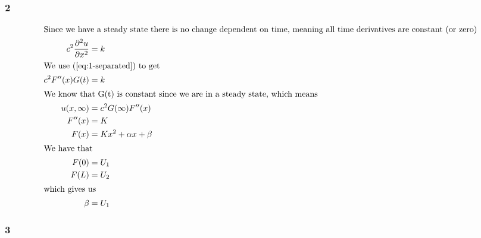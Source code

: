 \documentclass[a4paper]{article}
\newcommand{\ex}[1]{\subsubsection*{#1}}
\begin{document}
\ex{2}
\begin{align} 
    \intertext{Since we have a steady state there is no change dependent on time, meaning all time derivatives are constant (or zero)}
    c^2 \frac{\partial^2 u}{\partial x^2} &= k \label{eq:2-def} \\
    \intertext{We use (\ref{eq:1-separated}) to get}
    c^2 F''(x)G(t) &= k \\
    \intertext{We know that G(t) is constant since we are in a steady state,
        which means}
    u(x,\infty) &= c^2G(\infty)F''(x) \\
    F''(x) &= K \\
    F(x) &= Kx^2 + \alpha x + \beta \\
    \intertext{We have that}
    F(0) &= U_1 \\
    F(L) &= U_2 \\
    \intertext{which gives us}
    \beta &= U_1
\end{align}


\ex{3}

%
\end{document}
